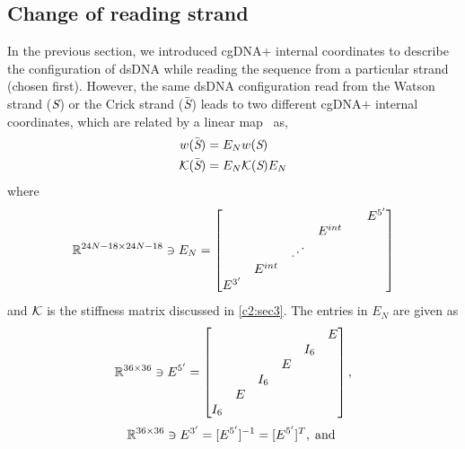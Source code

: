 \subsection{Change of reading strand}\label{c2:sec3sb1}
In the previous section, we introduced cgDNA$+$ internal coordinates to describe the configuration of dsDNA while reading the sequence from a particular strand (chosen first).
However, the same dsDNA configuration read from the Watson strand (${\textit{S}}$) or the Crick strand ($\bar{{\textit{S}}}$) leads to two different cgDNA$+$ internal coordinates, which are related by a linear map~\cite{petthesis,patelithesis} as,
\begin{equation}
\begin{split}
w(\bar{{\textit{S}}}) &= E_{N}w({\textit{S}})\\
{\mathcal K}(\bar{{\textit{S}}})&= E_{N}{\mathcal K}({\textit{S}})E_{N}
\end{split}
\label{changereadstrand}    
\end{equation}
where
\begin{equation}
\R^{24N-18\times24N-18} \ni E_{N} =  
\begin{bmatrix}
&&&&&E^{5^\prime} \\
&&&E^{int}&& \\
&& \reflectbox{$\ddots$} &&& \\
&E^{int}&&&& \\
E^{3^\prime}&&&&& \\
\end{bmatrix}
\label{Etot}
\end{equation}
and ${\mathcal K}$ is the stiffness matrix discussed in \cref{c2:sec3}.
The entries in $E_N$ are given as
\begin{equation}
\R^{36\times36} \ni E^{5^\prime}%
= 
\begin{bmatrix}
&&&&&E \\
&&&&I_6& \\
&&&E&& \\
&&I_6&&& \\
&E&&&& \\
I_6&&&&& \\
\end{bmatrix}, 
\label{Emat53}
\end{equation}
\begin{equation}
{\mathbb R}^{36\times36} \ni E^{3^\prime} =  [E^{5^\prime}]^{-1} = [E^{5^\prime}]^T , {\;\text{and\;}}
\label{Emat53}
\end{equation}

